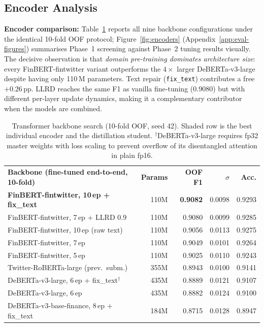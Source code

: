 \documentclass[11pt,a4paper]{article}
\newcommand{\tH}[1]{\textcolor{maincolor}{\textbf{#1}}}
\newcommand{\gmid}{\arrayrulecolor{maincolor}\midrule\arrayrulecolor{black}}
\begin{document}
\subsection{Encoder Analysis}

\textbf{Encoder comparison:} Table~\ref{tab:backbones} reports all nine backbone
configurations under the identical 10-fold OOF protocol; Figure~\ref{fig:encoders} (Appendix~\ref{app:eval-figures}) summarises
Phase~1 screening against Phase~2 tuning results visually. The decisive observation is
that \emph{domain pre-training dominates architecture size}: every FinBERT-fintwitter
variant outperforms the $4\times$ larger DeBERTa-v3-large despite having only 110\,M
parameters. Text repair (\texttt{fix\_text}) contributes a free $+0.26$\,pp. LLRD reaches
the same F1 as vanilla fine-tuning (0.9080) but with different per-layer update dynamics,
making it a complementary contributor when the models are combined.

\begin{table}[H]
  \centering\footnotesize\setlength{\tabcolsep}{5pt}
  \begin{tabularx}{\linewidth}{@{}>{\raggedright\arraybackslash}X r r r r@{}}
    \toprule
    \tH{Backbone (fine-tuned end-to-end, 10-fold)} & \tH{Params} & \tH{OOF F1} & \tH{$\sigma$} & \tH{Acc.} \\
    \gmid
    \rowcolor{lightgray}\textbf{FinBERT-fintwitter, 10\,ep + fix\_text} & 110M & \textbf{0.9082} & 0.0098 & 0.9293 \\
    FinBERT-fintwitter, 7\,ep + LLRD 0.9   & 110M & 0.9080 & 0.0099 & 0.9285 \\
    FinBERT-fintwitter, 10\,ep (raw text)   & 110M & 0.9056 & 0.0113 & 0.9275 \\
    FinBERT-fintwitter, 7\,ep              & 110M & 0.9049 & 0.0101 & 0.9264 \\
    FinBERT-fintwitter, 5\,ep              & 110M & 0.9025 & 0.0110 & 0.9243 \\
    Twitter-RoBERTa-large (prev.\ subm.)   & 355M & 0.8943 & 0.0100 & 0.9141 \\
    DeBERTa-v3-large, 6\,ep + fix\_text$^\dagger$ & 435M & 0.8889 & 0.0121 & 0.9107 \\
    DeBERTa-v3-large, 6\,ep               & 435M & 0.8882 & 0.0124 & 0.9100 \\
    DeBERTa-v3-base-finance, 8\,ep + fix\_text & 184M & 0.8715 & 0.0128 & 0.8947 \\
    \bottomrule
  \end{tabularx}
  \caption{Transformer backbone search (10-fold OOF, seed 42). Shaded row is the best individual
  encoder and the distillation student. $^\dagger$DeBERTa-v3-large requires fp32 master weights
  with loss scaling to prevent overflow of its disentangled attention in plain fp16.}
  \label{tab:backbones}
\end{table}
\end{document}
